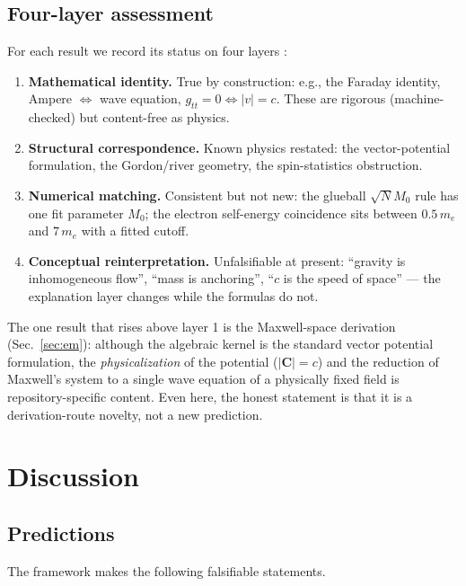 \documentclass[aps,prd,preprint,superscriptaddress,amsmath,amssymb]{revtex4-2}
\begin{document}
\subsection{Four-layer assessment}\label{sec:status}

For each result we record its status on four layers
\cite{ProjectionPhysics-status}:

\begin{enumerate}
  \item \textbf{Mathematical identity.}  True by construction: e.g., the
  Faraday identity, Ampere $\Leftrightarrow$ wave equation, $g_{tt}=0
  \Leftrightarrow |v|=c$.  These are rigorous (machine-checked) but
  content-free as physics.
  \item \textbf{Structural correspondence.}  Known physics restated: the
  vector-potential formulation, the Gordon/river geometry, the
  spin-statistics obstruction.
  \item \textbf{Numerical matching.}  Consistent but not new: the glueball
  $\sqrt{N}M_0$ rule has one fit parameter $M_0$; the electron self-energy
  coincidence sits between $0.5\,m_e$ and $7\,m_e$ with a fitted cutoff.
  \item \textbf{Conceptual reinterpretation.}  Unfalsifiable at present:
  ``gravity is inhomogeneous flow'', ``mass is anchoring'', ``$c$ is the
  speed of space'' --- the explanation layer changes while the formulas do
  not.
\end{enumerate}

The one result that rises above layer 1 is the Maxwell-space derivation
(Sec.~\ref{sec:em}): although the algebraic kernel is the standard vector
potential formulation, the \emph{physicalization} of the potential
($|\bm{C}|=c$) and the reduction of Maxwell's system to a single wave
equation of a physically fixed field is repository-specific content.  Even
here, the honest statement is that it is a derivation-route novelty, not a
new prediction.

\section{Discussion}\label{sec:discussion}

\subsection{Predictions}\label{sec:predictions}

The framework makes the following falsifiable statements.
\end{document}
